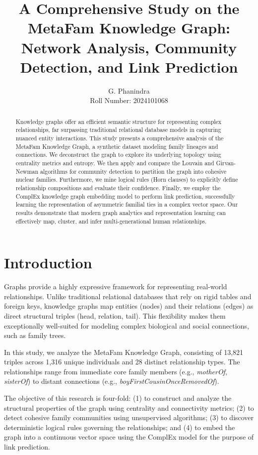 \documentclass[10pt,twocolumn,letterpaper]{article}
\title{A Comprehensive Study on the MetaFam Knowledge Graph: Network Analysis, Community Detection, and Link Prediction}
\author{G. Phanindra \\ Roll Number: 2024101068}
\date{}
\begin{document}
\maketitle

\begin{abstract}
Knowledge graphs offer an efficient semantic structure for representing complex relationships, far surpassing traditional relational database models in capturing nuanced entity interactions. This study presents a comprehensive analysis of the MetaFam Knowledge Graph, a synthetic dataset modeling family lineages and connections. We deconstruct the graph to explore its underlying topology using centrality metrics and entropy. We then apply and compare the Louvain and Girvan-Newman algorithms for community detection to partition the graph into cohesive nuclear families. Furthermore, we mine logical rules (Horn clauses) to explicitly define relationship compositions and evaluate their confidence. Finally, we employ the ComplEx knowledge graph embedding model to perform link prediction, successfully learning the representation of asymmetric familial ties in a complex vector space. Our results demonstrate that modern graph analytics and representation learning can effectively map, cluster, and infer multi-generational human relationships.
\end{abstract}

\section{Introduction}
Graphs provide a highly expressive framework for representing real-world relationships. Unlike traditional relational databases that rely on rigid tables and foreign keys, knowledge graphs map entities (nodes) and their relations (edges) as direct structural triples (head, relation, tail). This flexibility makes them exceptionally well-suited for modeling complex biological and social connections, such as family trees. 

In this study, we analyze the MetaFam Knowledge Graph, consisting of 13,821 triples across 1,316 unique individuals and 28 distinct relationship types. The relationships range from immediate core family members (e.g., \textit{motherOf}, \textit{sisterOf}) to distant connections (e.g., \textit{boyFirstCousinOnceRemovedOf}). 

The objective of this research is four-fold: (1) to construct and analyze the structural properties of the graph using centrality and connectivity metrics; (2) to detect cohesive family communities using unsupervised algorithms; (3) to discover deterministic logical rules governing the relationships; and (4) to embed the graph into a continuous vector space using the ComplEx model for the purpose of link prediction.
\end{document}
